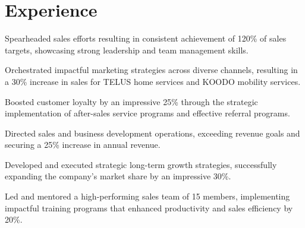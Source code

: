 \section{Experience}


      \begin{tightemize}
          \item Spearheaded sales efforts resulting in consistent achievement of 120\% of sales targets, showcasing strong leadership and team management skills.
          \item Orchestrated impactful marketing strategies across diverse channels, resulting in a 30\% increase in sales for TELUS home services and KOODO mobility services.
          \item Boosted customer loyalty by an impressive 25\% through the strategic implementation of after-sales service programs and effective referral programs.
      \end{tightemize}



      \begin{tightemize}
          \item Directed sales and business development operations, exceeding revenue goals and securing a 25\% increase in annual revenue.
          \item Developed and executed strategic long-term growth strategies, successfully expanding the company’s market share by an impressive 30\%.
          \item Led and mentored a high-performing sales team of 15 members, implementing impactful training programs that enhanced productivity and sales efficiency by 20\%.
      \end{tightemize}
